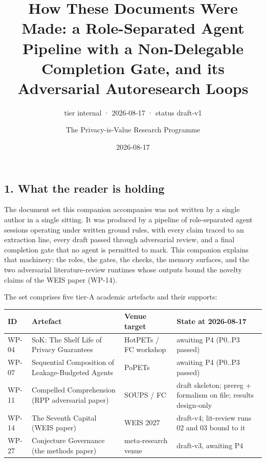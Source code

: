 \documentclass[
  11pt,
]{article}
\title{How These Documents Were Made: a Role-Separated Agent Pipeline
with a Non-Delegable Completion Gate, and its Adversarial Autoresearch
Loops}
\subtitle{tier internal · 2026-08-17 · status draft-v1}
\author{The Privacy-is-Value Research Programme}
\date{2026-08-17}
\newcounter{none} %
\begin{document}
\maketitle

\subsection{1. What the reader is
holding}\label{what-the-reader-is-holding}

The document set this companion accompanies was not written by a single
author in a single sitting. It was produced by a pipeline of
role-separated agent sessions operating under written ground rules, with
every claim traced to an extraction line, every draft passed through
adversarial review, and a final completion gate that no agent is
permitted to mark. This companion explains that machinery: the roles,
the gates, the checks, the memory surfaces, and the two adversarial
literature-review runtimes whose outputs bound the novelty claims of the
WEIS paper (WP-14).

The set comprises five tier-A academic artefacts and their supports:

{\def\LTcaptype{none} %
\begin{longtable}[]{@{}
  >{\raggedright\arraybackslash}p{}
  >{\raggedright\arraybackslash}p{}
  >{\raggedright\arraybackslash}p{}
  >{\raggedright\arraybackslash}p{}@{}}
\toprule\noalign{}
\begin{minipage}[b]{\linewidth}\raggedright
ID
\end{minipage} & \begin{minipage}[b]{\linewidth}\raggedright
Artefact
\end{minipage} & \begin{minipage}[b]{\linewidth}\raggedright
Venue target
\end{minipage} & \begin{minipage}[b]{\linewidth}\raggedright
State at 2026-08-17
\end{minipage} \\
\midrule\noalign{}
\endhead
\bottomrule\noalign{}
\endlastfoot
WP-04 & SoK: The Shelf Life of Privacy Guarantees & HotPETs / FC
workshop & awaiting P4 (P0..P3 passed) \\
WP-07 & Sequential Composition of Leakage-Budgeted Agents & PoPETs &
awaiting P4 (P0..P3 passed) \\
WP-11 & Compelled Comprehension (RPP adversarial paper) & SOUPS / FC &
draft skeleton; prereg + formalism on file; results design-only \\
WP-14 & The Seventh Capital (WEIS paper) & WEIS 2027 & draft-v4;
lit-review runs 02 and 03 bound to it \\
WP-27 & Conjecture Governance (the methods paper) & meta-research venue
& draft-v3, awaiting P4 \\
\end{longtable}
}
\end{document}

